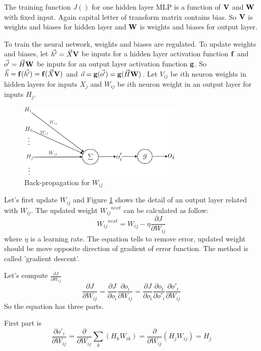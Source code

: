 \documentclass[draft,dvipsnames]{drexel-thesis}
\begin{document}
\begin{thesis}
The training function $J()$ for one hidden layer MLP is a function of $\bold{V}$ and $\bold{W}$ with fixed input. Again capital letter of transform matrix contains bias. So $\bold{V}$ is weights and biases for hidden layer and $\bold{W}$ is weights and biases for output layer.

To train the neural network, weights and biases are regulated. To update weights and biases, let $\vec{h'}=\vec{X}\bold{V}$ be inputs for a hidden layer activation function $\bold{f}$ and $\vec{o'}=\vec{H}\bold{W}$ be inputs for an output layer activation function $\bold{g}$. So $\vec{h}=\bold{f}(\vec{h'})=\bold{f}(\vec{X}\bold{V})$ and $\vec{o}=\bold{g}(\vec{o'})=\bold{g}(\vec{H}\bold{W})$. Let $V_{ij}$ be $i$th neuron weights in hidden layers for inputs  $X_j$ and $W_{ij}$ be $i$th neuron weight in an output layer for inputs $H_j$.

\begin{figure}[t!]
    \centering
    \includegraphics[width=0.7\textwidth]{pictures/figures/BP1.png}
    \caption{Back-propagation for $W_{ij}$}
    \label{fig:BP1}
\end{figure}

Let's first update $W_{ij}$ and Figure \ref{fig:BP1} shows the detail of an output layer related with ${W_{ij}}$. The updated weight ${{W_{ij}}^{next}}$ can be calculated as follow:
$${{W_{ij}}^{next}}=W_{ij} - \eta\frac{\partial J}{\partial W_{ij}}$$ where $\eta$ is a learning rate. The equation tells to remove error, updated weight should be move opposite direction of gradient of error function. The method is called 'gradient descent'.

Let's compute $\frac{\partial J}{\partial W_{ij}}$
$$
\frac{\partial J}{\partial W_{ij}}
= \frac{\partial J}{\partial o_i}\frac{\partial o_i}{\partial W_{ij}}
= \frac{\partial J}{\partial o_i}\frac{\partial o_i}{\partial o'_i}\frac{\partial o'_i}{\partial W_{ij}}
$$
So the equation has three parts.

First part is
$$
\frac{\partial o'_i}{\partial W_{ij}}
= \frac{\partial}{\partial W_{ij}}\sum_k(H_kW_{ik})
= \frac{\partial}{\partial W_{ij}}(H_jW_{ij})
= H_j
$$


\end{thesis}
\end{document}
